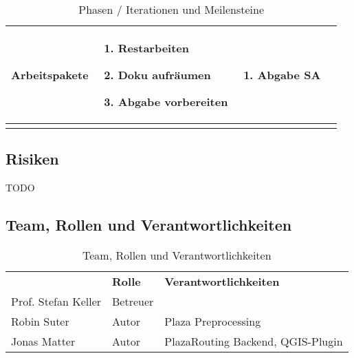 \begin{landscape}
\begin{longtable}{l p{5.5cm} p{5.5cm} p{5.5cm}}
        \textbf{Arbeitspakete}
                                & \begin{enumerate}[noitemsep]
                                    \item Restarbeiten
                                    \item Doku aufräumen
                                    \item Abgabe vorbereiten
                                \end{enumerate}
                                & \begin{enumerate}[noitemsep]
                                    \item Abgabe SA
                                \end{enumerate}
                                & \\
        
        \bottomrule
    \caption{Phasen / Iterationen und Meilensteine}
    \label{table:Phasen / Iterationen und Meilensteine}
\end{longtable}
\end{landscape}

\subsection{Risiken}
\label{sub:Risiken}

TODO

\subsection{Team, Rollen und Verantwortlichkeiten}
\label{sub:Team, Rollen und Verantwortlichkeiten}

\begin{table}[H]
    \centering
    \caption{Team, Rollen und Verantwortlichkeiten}
    \label{table: Team, Rollen und Verantwortlichkeiten}
    \begin{tabular}{lll}
        & \textbf{Rolle} & \textbf{Verantwortlichkeiten}    \\
        Prof. Stefan Keller  &        Betreuer                   &    \\
        Robin Suter          &        Autor                      & Plaza Preprocessing \\
        Jonas Matter         &        Autor                      & PlazaRouting Backend, QGIS-Plugin
    \end{tabular}
\end{table}